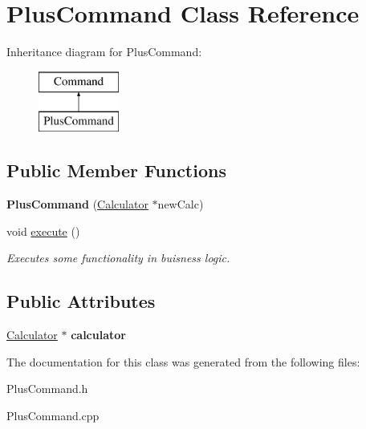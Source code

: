 \hypertarget{class_plus_command}{}\section{Plus\+Command Class Reference}
\label{class_plus_command}
Inheritance diagram for Plus\+Command\+:\begin{figure}[H]
\begin{center}
\leavevmode
\includegraphics[height=2.000000cm]{class_plus_command}
\end{center}
\end{figure}
\subsection*{Public Member Functions}
\begin{DoxyCompactItemize}
\item 
\hypertarget{class_plus_command_a687cab12cc701d06dcf998c42c30bc31}{}{\bfseries Plus\+Command} (\hyperlink{class_calculator}{Calculator} $\ast$new\+Calc)\label{class_plus_command_a687cab12cc701d06dcf998c42c30bc31}

\item 
\hypertarget{class_plus_command_a43c95e8e8ac4260f507f92d9d40f0699}{}void \hyperlink{class_plus_command_a43c95e8e8ac4260f507f92d9d40f0699}{execute} ()\label{class_plus_command_a43c95e8e8ac4260f507f92d9d40f0699}

\begin{DoxyCompactList}\small\item\em Executes some functionality in buisness logic. \end{DoxyCompactList}\end{DoxyCompactItemize}
\subsection*{Public Attributes}
\begin{DoxyCompactItemize}
\item 
\hypertarget{class_plus_command_a6dd3da59e837ac5bcd1063ecc5895f0e}{}\hyperlink{class_calculator}{Calculator} $\ast$ {\bfseries calculator}\label{class_plus_command_a6dd3da59e837ac5bcd1063ecc5895f0e}

\end{DoxyCompactItemize}


The documentation for this class was generated from the following files\+:\begin{DoxyCompactItemize}
\item 
Plus\+Command.\+h\item 
Plus\+Command.\+cpp\end{DoxyCompactItemize}
